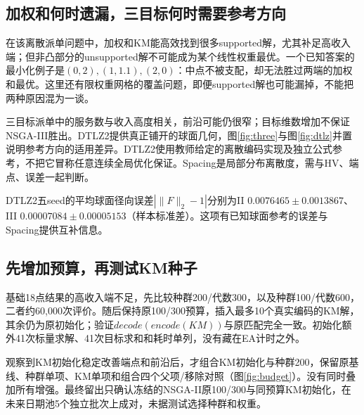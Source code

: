 \subsection{加权和何时遗漏，三目标何时需要参考方向}
在该离散派单问题中，加权和KM能高效找到很多supported解，尤其补足高收入端；但非凸部分的unsupported解不可能成为某个线性权重最优。一个已知答案的最小化例子是$(0,2),(1,1.1),(2,0)$：中点不被支配，却无法胜过两端的加权和最优。这里还有限权重网格的覆盖问题，即便supported解也可能漏掉，不能把两种原因混为一谈。

三目标派单中的服务数与收入高度相关，前沿可能仍很窄；目标维数增加不保证NSGA-III胜出。DTLZ2提供真正铺开的球面几何，图\ref{fig:three}与图\ref{fig:dtlz}并置说明参考方向的适用差异。DTLZ2使用教师给定的离散编码实现及独立公式参考，不把它冒称任意连续全局优化保证。Spacing是局部分布离散度，需与HV、端点、误差一起判断。

DTLZ2五seed的平均球面径向误差$|\lVert F\rVert_2-1|$分别为II $0.0076465\pm0.0013867$、III $0.00007084\pm0.00005153$（样本标准差）。这项有已知球面参考的误差与Spacing提供互补信息。

\subsection{先增加预算，再测试KM种子}
基础18点结果的高收入端不足，先比较种群200/代数300，以及种群100/代数600，二者约60,000次评价。随后保持原100/300预算，插入最多10个真实编码的KM解，其余仍为原初始化；验证$decode(encode(KM))$与原匹配完全一致。初始化额外41次标量求解、41次目标求和和耗时单列，没有藏在EA计时之外。

观察到KM初始化稳定改善端点和前沿后，才组合KM初始化与种群200，保留原基线、种群单项、KM单项和组合四个父项/移除对照（图\ref{fig:budget}）。没有同时叠加所有增强。最终留出只确认冻结的NSGA-II原100/300与同预算KM初始化，在未来日期池5个独立批次上成对，未据测试选择种群和权重。




